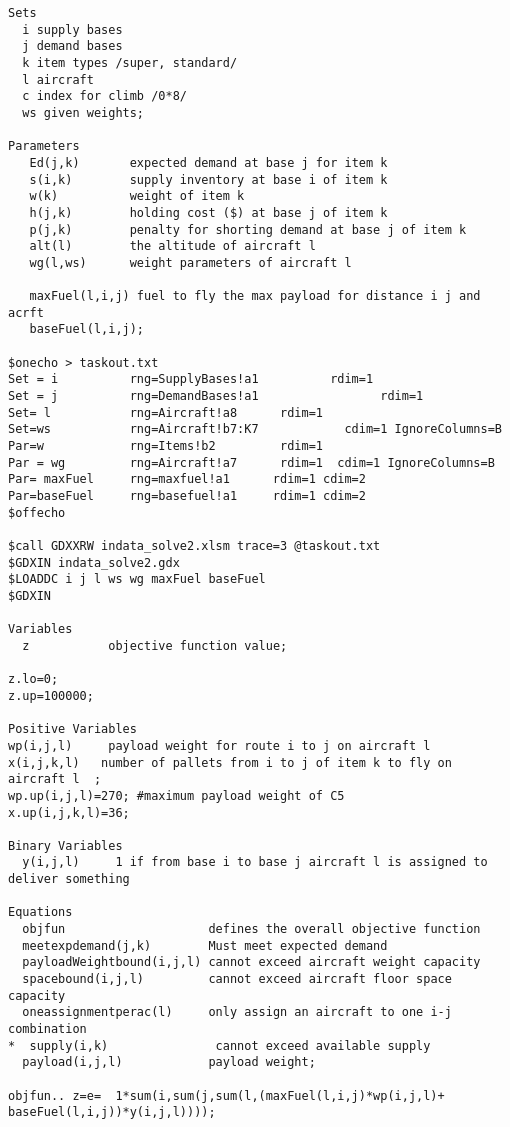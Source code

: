 \begin{lstlisting}
Sets
  i supply bases
  j demand bases
  k item types /super, standard/
  l aircraft
  c index for climb /0*8/
  ws given weights;

Parameters
   Ed(j,k)       expected demand at base j for item k
   s(i,k)        supply inventory at base i of item k
   w(k)          weight of item k
   h(j,k)        holding cost ($) at base j of item k
   p(j,k)        penalty for shorting demand at base j of item k
   alt(l)        the altitude of aircraft l
   wg(l,ws)      weight parameters of aircraft l

   maxFuel(l,i,j) fuel to fly the max payload for distance i j and acrft
   baseFuel(l,i,j);

$onecho > taskout.txt
Set = i          rng=SupplyBases!a1          rdim=1
Set = j          rng=DemandBases!a1                 rdim=1
Set= l           rng=Aircraft!a8      rdim=1
Set=ws           rng=Aircraft!b7:K7            cdim=1 IgnoreColumns=B
Par=w            rng=Items!b2         rdim=1
Par = wg         rng=Aircraft!a7      rdim=1  cdim=1 IgnoreColumns=B
Par= maxFuel     rng=maxfuel!a1      rdim=1 cdim=2
Par=baseFuel     rng=basefuel!a1     rdim=1 cdim=2
$offecho

$call GDXXRW indata_solve2.xlsm trace=3 @taskout.txt
$GDXIN indata_solve2.gdx
$LOADDC i j l ws wg maxFuel baseFuel
$GDXIN

Variables
  z           objective function value;

z.lo=0;
z.up=100000;

Positive Variables
wp(i,j,l)     payload weight for route i to j on aircraft l
x(i,j,k,l)   number of pallets from i to j of item k to fly on aircraft l  ;
wp.up(i,j,l)=270; #maximum payload weight of C5
x.up(i,j,k,l)=36;

Binary Variables
  y(i,j,l)     1 if from base i to base j aircraft l is assigned to deliver something

Equations
  objfun                    defines the overall objective function
  meetexpdemand(j,k)        Must meet expected demand
  payloadWeightbound(i,j,l) cannot exceed aircraft weight capacity
  spacebound(i,j,l)         cannot exceed aircraft floor space capacity
  oneassignmentperac(l)     only assign an aircraft to one i-j combination
*  supply(i,k)               cannot exceed available supply
  payload(i,j,l)            payload weight;

objfun.. z=e=  1*sum(i,sum(j,sum(l,(maxFuel(l,i,j)*wp(i,j,l)+
baseFuel(l,i,j))*y(i,j,l))));


\end{lstlisting}
